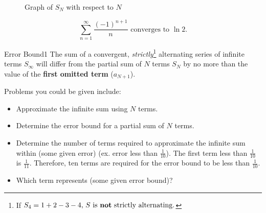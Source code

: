 \documentclass[10pt]{article}
\theoremstyle{definition}
\begin{document}
\begin{figure}[h]
\centering


\caption{Graph of $S_N$ with respect to $N$}
\end{figure}

\[\sum_{n=1}^{\infty} \frac{(-1)^{n+1}}{n} \text{ converges to } \ln 2.\]

\vspace{0.5cm}

\begin{theorem}{Error Bound}{1}
The sum of a convergent, \emph{strictly}\footnote[1]{If $S_4=1+2-3-4 \text{, $S$ is \textbf{not} strictly alternating.}$} alternating series of infinite terms $S_\infty$ will differ from the partial sum of $N$ terms $S_N$ by no more than the value of the \textbf{first omitted term} ($a_{N+1}$).
\end{theorem}

\vspace{0.5cm}

Problems you could be given include:
\begin{itemize}
    \item Approximate the infinite sum using $N$ terms.
    \item Determine the error bound for a partial sum of $N$ terms.
    \item Determine the number of terms required to approximate the infinite sum within (some given error) (ex. error less than $\frac{1}{10}$). The first term less than $\frac{1}{10}$ is $\frac{1}{11}$. 
    \vspace{0.1cm}
    Therefore, ten terms are required for the error bound to be less than $\frac{1}{10}$.
    \item Which term represents (some given error bound)?
\end{itemize}
\end{document}
